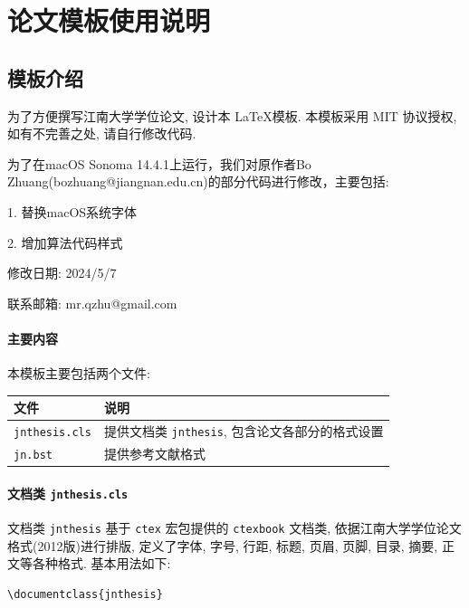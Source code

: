 

\chapter{论文模板使用说明}
\label{ch99}


\section{模板介绍}

为了方便撰写江南大学学位论文, 设计本 \LaTeX 模板.
本模板采用 MIT 协议授权, 如有不完善之处, 请自行修改代码.

为了在macOS Sonoma 14.4.1上运行，我们对原作者Bo Zhuang(bozhuang@jiangnan.edu.cn)的部分代码进行修改，主要包括:

1. 替换macOS系统字体

2. 增加算法代码样式

修改日期: 2024/5/7

联系邮箱: mr.qzhu@gmail.com

\subsubsection*{主要内容}

本模板主要包括两个文件:

\begin{tabular}{ll}
\hline
文件 & 说明\\
\hline
{\tt{jnthesis.cls}} & 提供文档类 {\tt{jnthesis}}, 包含论文各部分的格式设置\\
{\tt{jn.bst}} & 提供参考文献格式\\
\hline
\end{tabular}

\subsubsection*{文档类 {\tt{jnthesis.cls}}}

文档类 {\tt jnthesis} 基于 {\tt ctex} 宏包提供的 {\tt ctexbook} 文档类,
依据江南大学学位论文格式(2012版)进行排版,
定义了字体, 字号, 行距, 标题, 页眉, 页脚, 目录, 摘要, 正文等各种格式.
基本用法如下:

\begin{lstlisting}[basicstyle=\ttfamily, frame=single]
\documentclass{jnthesis}
\end{lstlisting}

